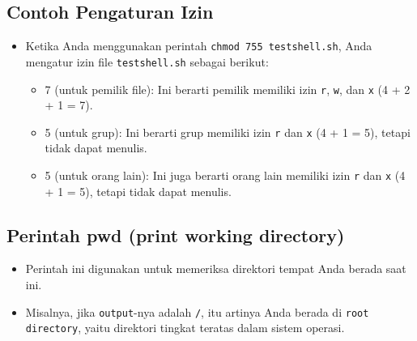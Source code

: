 \documentclass{article}
\begin{document}
\subsection{Contoh Pengaturan Izin}
\begin{itemize}
    \item Ketika Anda menggunakan perintah \texttt{chmod 755 testshell.sh}, Anda mengatur izin file \texttt{testshell.sh} sebagai berikut:
          \begin{itemize}
              \item 7 (untuk pemilik file): Ini berarti pemilik memiliki izin \texttt{r}, \texttt{w}, dan \texttt{x} (4 + 2 + 1 = 7).
              \item 5 (untuk grup): Ini berarti grup memiliki izin \texttt{r} dan \texttt{x} (4 + 1 = 5), tetapi tidak dapat menulis.
              \item 5 (untuk orang lain): Ini juga berarti orang lain memiliki izin \texttt{r} dan \texttt{x} (4 + 1 = 5), tetapi tidak dapat menulis.
          \end{itemize}
\end{itemize}

\subsection{Perintah pwd (print working directory)}
\begin{itemize}
    \item Perintah ini digunakan untuk memeriksa direktori tempat Anda berada saat ini.
    \item Misalnya, jika \texttt{output}-nya adalah \texttt{/}, itu artinya Anda berada di \texttt{root directory}, yaitu direktori tingkat teratas dalam sistem operasi.
\end{itemize}
\end{document}
